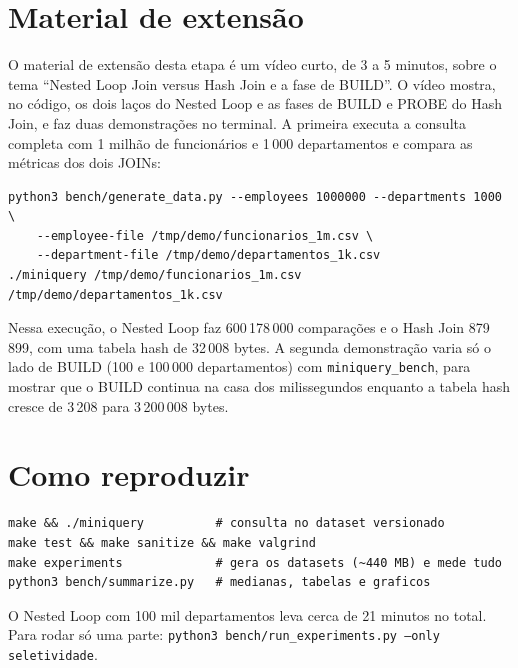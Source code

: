 \documentclass[11pt,a4paper]{article}
\begin{document}
\section{Material de extensão}\label{sec:extensao}
O material de extensão desta etapa é um vídeo curto, de 3 a 5 minutos, sobre o tema ``Nested Loop Join versus Hash Join e a fase de BUILD''. O vídeo mostra, no código, os dois laços do Nested Loop e as fases de BUILD e PROBE do Hash Join, e faz duas demonstrações no terminal. A primeira executa a consulta completa com 1 milhão de funcionários e 1\,000 departamentos e compara as métricas dos dois JOINs:
\par\medskip\noindent\begin{minipage}{\linewidth}
\begin{lstlisting}
python3 bench/generate_data.py --employees 1000000 --departments 1000 \
    --employee-file /tmp/demo/funcionarios_1m.csv \
    --department-file /tmp/demo/departamentos_1k.csv
./miniquery /tmp/demo/funcionarios_1m.csv /tmp/demo/departamentos_1k.csv
\end{lstlisting}
\end{minipage}\par\medskip
Nessa execução, o Nested Loop faz 600\,178\,000 comparações e o Hash Join 879\,899, com uma tabela hash de 32\,008 bytes. A segunda demonstração varia só o lado de BUILD (100 e 100\,000 departamentos) com \texttt{miniquery\_bench}, para mostrar que o BUILD continua na casa dos milissegundos enquanto a tabela hash cresce de 3\,208 para 3\,200\,008 bytes.

\section{Como reproduzir}
\par\medskip\noindent\begin{minipage}{\linewidth}
\begin{lstlisting}
make && ./miniquery          # consulta no dataset versionado
make test && make sanitize && make valgrind
make experiments             # gera os datasets (~440 MB) e mede tudo
python3 bench/summarize.py   # medianas, tabelas e graficos
\end{lstlisting}
\end{minipage}\par\medskip
O Nested Loop com 100 mil departamentos leva cerca de 21 minutos no total. Para rodar só uma parte: \texttt{python3 bench/run\_experiments.py --only seletividade}.
\end{document}
